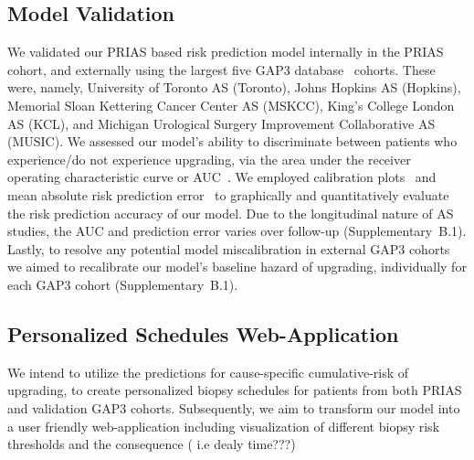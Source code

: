 \subsection{Model Validation}
We validated our PRIAS based risk prediction model internally in the PRIAS cohort, and externally using the largest five GAP3 database~\citep{gap3_2018} cohorts. These were, namely, University of Toronto AS (Toronto), Johns Hopkins AS (Hopkins), Memorial Sloan Kettering Cancer Center AS (MSKCC), King's College London AS (KCL), and Michigan Urological Surgery Improvement Collaborative AS (MUSIC). We assessed our model's ability to discriminate between patients who experience/do not experience upgrading, via the area under the receiver operating characteristic curve or AUC~\citep{rizopoulos2017dynamic}. We employed calibration plots~\citep{royston2013external,steyerberg2010assessing} and mean absolute risk prediction error~\citep{rizopoulos2017dynamic} to graphically and quantitatively evaluate the risk prediction accuracy of our model. Due to the longitudinal nature of AS studies, the AUC and prediction error varies over follow-up (Supplementary~B.1). Lastly, to resolve any potential model miscalibration in external GAP3 cohorts we aimed to recalibrate our model's baseline hazard of upgrading, individually for each GAP3 cohort (Supplementary~B.1).

\subsection{Personalized Schedules Web-Application}
We intend to utilize the predictions for cause-specific cumulative-risk of upgrading, to create personalized biopsy schedules for patients from both PRIAS and validation GAP3 cohorts. Subsequently, we aim to transform our model into a user friendly web-application including visualization of different biopsy risk thresholds and the consequence ( i.e dealy time???)